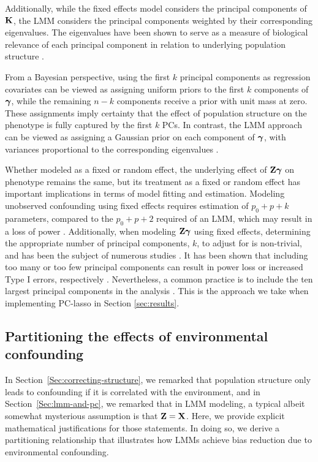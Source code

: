 Additionally, while the fixed effects model considers the principal components of $\mathbf{K}$, the LMM considers the principal components weighted by their corresponding eigenvalues. The eigenvalues have been shown to serve as a measure of biological relevance of each principal component in relation to underlying population structure \citep{hoffman2013correcting, price2006principal}. 

From a Bayesian perspective, using the first $k$ principal components as regression covariates can be viewed as assigning uniform priors to the first $k$ components of $\boldsymbol{\gamma}$, while the remaining $n - k$ components receive a prior with unit mass at zero. These assignments imply certainty that the effect of population structure on the phenotype is fully captured by the first $k$ PCs. In contrast, the LMM approach can be viewed as assigning a Gaussian prior on each component of $\boldsymbol{\gamma}$, with variances proportional to the corresponding eigenvalues \citep{astle2009population}. 



Whether modeled as a fixed or random effect, the underlying effect of $\mathbf{Z} \boldsymbol{\gamma}$ on phenotype remains the same, but its treatment as a fixed or random effect has important implications in terms of model fitting and estimation. Modeling unobserved confounding using fixed effects requires estimation of $p_0 + p + k$ parameters, compared to the $p_0 + p + 2$ required of an LMM, which may result in a loss of power \citep{zhang2015principal}. Additionally, when modeling $\mathbf{Z} \boldsymbol{\gamma}$ using fixed effects, determining the appropriate number of principal components, $k$, to adjust for is non-trivial, and has been the subject of numerous studies \citep{patterson2006population, zhao2018practical}. It has been shown that including too many or too few principal components can result in power loss or increased Type I errors, respectively \citep{zhang2015principal}. Nevertheless, a common practice is to include the ten largest principal components in the analysis \citep{zhao2018practical}. This is the approach we take when implementing PC-lasso in Section \ref{sec:results}.

\subsection{Partitioning the effects of environmental confounding}
\label{sec:partition}

In Section~\ref{Sec:correcting-structure}, we remarked that population structure only leads to confounding if it is correlated with the
environment, and in Section~\ref{Sec:lmm-and-pc}, we remarked that in LMM modeling, a typical albeit somewhat mysterious assumption is that $\mathbf{Z}=\mathbf{X}$.  Here, we provide explicit mathematical justifications for those statements.  In doing so, we derive a partitioning relationship that illustrates how LMMs achieve bias reduction due to environmental confounding.

